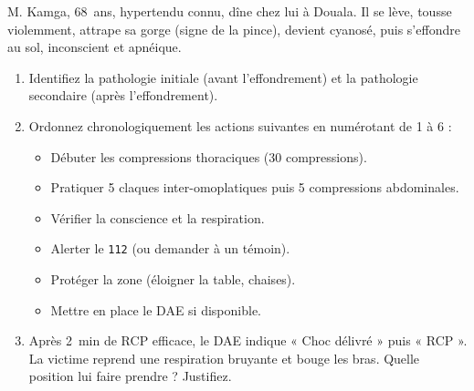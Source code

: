 \documentclass[11pt]{article}
\begin{document}
\begin{exercice}
M. Kamga, \num{68}~ans, hypertendu connu, dîne chez lui à Douala. Il se lève, tousse violemment, attrape sa gorge (signe de la pince), devient cyanosé, puis s'effondre au sol, inconscient et apnéique.
\begin{enumerate}
    \item Identifiez la pathologie initiale (avant l'effondrement) et la pathologie secondaire (après l'effondrement).
    \item Ordonnez chronologiquement les actions suivantes en numérotant de 1 à 6 :
    \begin{itemize}
        \item[A.] Débuter les compressions thoraciques (\num{30} compressions).
        \item[B.] Pratiquer \num{5} claques inter-omoplatiques puis \num{5} compressions abdominales.
        \item[C.] Vérifier la conscience et la respiration.
        \item[D.] Alerter le \texttt{112} (ou demander à un témoin).
        \item[E.] Protéger la zone (éloigner la table, chaises).
        \item[F.] Mettre en place le DAE si disponible.
    \end{itemize}
    \item Après \SI{2}{\minute} de RCP efficace, le DAE indique « Choc délivré » puis « RCP ». La victime reprend une respiration bruyante et bouge les bras. Quelle position lui faire prendre ? Justifiez.
\end{enumerate}
\end{exercice}
\end{document}
